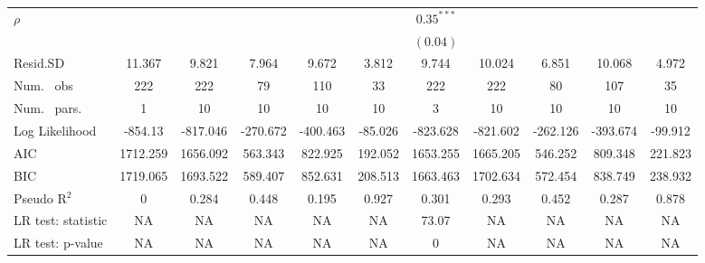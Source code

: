 \begin{table}
\begin{center}
\begin{tabular}{l c c c c c c c c c c}
$\rho$                            &               &               &                &                &               & $0.35^{***}$  &               &               &               &               \\
                                  &               &               &                &                &               & $(0.04)$      &               &               &               &               \\
\hline
Resid.SD                          & 11.367        & 9.821         & 7.964          & 9.672          & 3.812         & 9.744         & 10.024        & 6.851         & 10.068        & 4.972         \\
Num. \ obs                        & 222           & 222           & 79             & 110            & 33            & 222           & 222           & 80            & 107           & 35            \\
Num. \ pars.                      & 1             & 10            & 10             & 10             & 10            & 3             & 10            & 10            & 10            & 10            \\
Log Likelihood                    & -854.13       & -817.046      & -270.672       & -400.463       & -85.026       & -823.628      & -821.602      & -262.126      & -393.674      & -99.912       \\
AIC                               & 1712.259      & 1656.092      & 563.343        & 822.925        & 192.052       & 1653.255      & 1665.205      & 546.252       & 809.348       & 221.823       \\
BIC                               & 1719.065      & 1693.522      & 589.407        & 852.631        & 208.513       & 1663.463      & 1702.634      & 572.454       & 838.749       & 238.932       \\
Pseudo R$^2$                      & 0             & 0.284         & 0.448          & 0.195          & 0.927         & 0.301         & 0.293         & 0.452         & 0.287         & 0.878         \\
LR test: statistic                & NA            & NA            & NA             & NA             & NA            & 73.07         & NA            & NA            & NA            & NA            \\
LR test: p-value                  & NA            & NA            & NA             & NA             & NA            & 0             & NA            & NA            & NA            & NA            \\

\end{tabular}
\end{center}
\end{table}
